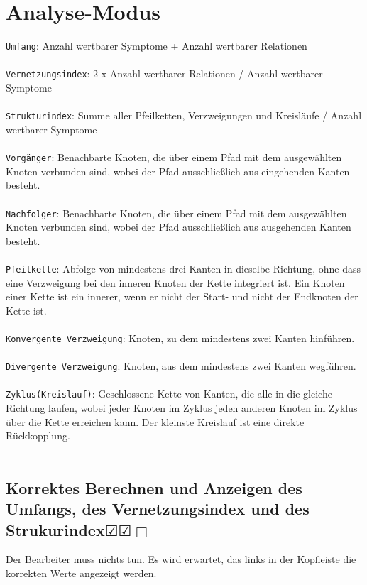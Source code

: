 \documentclass[enabledeprecatedfontcommands]{scrartcl}
\newcommand{\subsectiont}[2]{\subsection[#1]{#1{\normalsize\normalfont #2}}}
\newcommand{\leer}{$\Box$}
\newcommand{\ok}{$\CheckedBox$}
\begin{document}
\section{Analyse-Modus}

\texttt{Umfang}: Anzahl wertbarer Symptome + Anzahl wertbarer Relationen\\\\
\texttt{Vernetzungsindex}: 2 x Anzahl wertbarer Relationen / Anzahl wertbarer Symptome\\\\
\texttt{Strukturindex}: Summe aller Pfeilketten, Verzweigungen und Kreisläufe / Anzahl wertbarer Symptome\\\\
\texttt{Vorgänger}: Benachbarte Knoten, die über einem Pfad mit dem ausgewählten Knoten verbunden sind, 
wobei der Pfad ausschließlich aus eingehenden Kanten besteht.\\\\
\texttt{Nachfolger}: Benachbarte Knoten, die über einem Pfad mit dem ausgewählten Knoten verbunden sind,
wobei der Pfad ausschließlich aus ausgehenden Kanten besteht.\\\\
\texttt{Pfeilkette}: Abfolge von mindestens drei Kanten in dieselbe Richtung, ohne dass eine Verzweigung bei den inneren Knoten der Kette integriert ist. Ein Knoten einer Kette ist ein innerer, wenn er nicht der Start- und nicht der Endknoten der Kette ist.\\\\
\texttt{Konvergente Verzweigung}: Knoten, zu dem mindestens zwei Kanten hinführen.\\\\
\texttt{Divergente Verzweigung}: Knoten, aus dem mindestens zwei Kanten wegführen.\\\\
\texttt{Zyklus(Kreislauf)}: Geschlossene Kette von Kanten, die alle in die gleiche Richtung laufen, wobei jeder Knoten im Zyklus jeden anderen Knoten im Zyklus über die Kette erreichen kann. Der kleinste Kreislauf ist eine direkte Rückkopplung.\\\\

\subsectiont{Korrektes Berechnen und Anzeigen des Umfangs, des Vernetzungsindex und des Strukurindex}{\dotfill\ok\ok\leer}
Der Bearbeiter muss nichts tun. Es wird erwartet, das links in der Kopfleiste die korrekten Werte angezeigt werden. 
\end{document}
